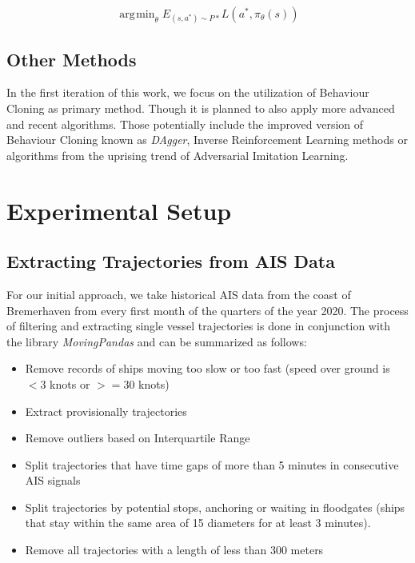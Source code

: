 \documentclass[conference]{IEEEtran}
\DeclareMathOperator*{\argmin}{\arg\!\min}
\begin{document}
\begin{equation}
\argmin_\theta E_{(s,a^*) \sim P*} L(a^*, \pi_\theta(s))
\end{equation}




\subsection{Other Methods}
In the first iteration of this work, we focus on the utilization of Behaviour Cloning as primary method. Though it is planned to also apply more advanced and recent algorithms. Those potentially include the improved version of Behaviour Cloning known as \textit{DAgger}\cite{ross2011reduction}, Inverse Reinforcement Learning methods or algorithms from the uprising trend of Adversarial Imitation Learning.


\section{Experimental Setup}
\subsection{Extracting Trajectories from AIS Data}
For our initial approach, we take historical AIS data from the coast of Bremerhaven from every first month of the quarters of the year 2020. The process of filtering and extracting single vessel trajectories is done in conjunction with the library \textit{MovingPandas}\cite{graser2019movingpandas} and can be summarized as follows:

\begin{itemize}
    \item Remove records of ships moving too slow or too fast (speed over ground is $<3$ knots or $>=30$ knots)
    \item Extract provisionally trajectories
    \item Remove outliers based on Interquartile Range
    \item Split trajectories that have time gaps of more than 5 minutes in consecutive AIS signals
    \item Split trajectories by potential stops, anchoring or waiting in floodgates (ships that stay within the same area of 15 diameters for at least 3 minutes).
    \item Remove all trajectories with a length of less than 300 meters
\end{itemize}
\end{document}
